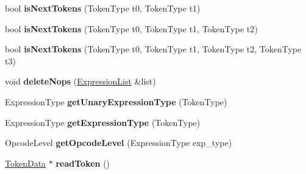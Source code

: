 \begin{DoxyCompactItemize}
\item 
bool {\bfseries is\+Next\+Tokens} (Token\+Type t0, Token\+Type t1)\hypertarget{class_object_script_1_1_o_s_1_1_core_1_1_compiler_a6330a2c5da53bb10a692d3b390b13b20}{}\label{class_object_script_1_1_o_s_1_1_core_1_1_compiler_a6330a2c5da53bb10a692d3b390b13b20}

\item 
bool {\bfseries is\+Next\+Tokens} (Token\+Type t0, Token\+Type t1, Token\+Type t2)\hypertarget{class_object_script_1_1_o_s_1_1_core_1_1_compiler_adafed82bae5313c8b7965a3db9e4e2ef}{}\label{class_object_script_1_1_o_s_1_1_core_1_1_compiler_adafed82bae5313c8b7965a3db9e4e2ef}

\item 
bool {\bfseries is\+Next\+Tokens} (Token\+Type t0, Token\+Type t1, Token\+Type t2, Token\+Type t3)\hypertarget{class_object_script_1_1_o_s_1_1_core_1_1_compiler_a9a2380d2370b1dfd2627f7a5cec78ec1}{}\label{class_object_script_1_1_o_s_1_1_core_1_1_compiler_a9a2380d2370b1dfd2627f7a5cec78ec1}

\item 
void {\bfseries delete\+Nops} (\hyperlink{struct_object_script_1_1_o_s_1_1_core_1_1_compiler_1_1_expression_list}{Expression\+List} \&list)\hypertarget{class_object_script_1_1_o_s_1_1_core_1_1_compiler_ad318617fef184ea91c1d6c526dbc9d29}{}\label{class_object_script_1_1_o_s_1_1_core_1_1_compiler_ad318617fef184ea91c1d6c526dbc9d29}

\item 
Expression\+Type {\bfseries get\+Unary\+Expression\+Type} (Token\+Type)\hypertarget{class_object_script_1_1_o_s_1_1_core_1_1_compiler_a2e6e537dce170b4e7a289423f43798f1}{}\label{class_object_script_1_1_o_s_1_1_core_1_1_compiler_a2e6e537dce170b4e7a289423f43798f1}

\item 
Expression\+Type {\bfseries get\+Expression\+Type} (Token\+Type)\hypertarget{class_object_script_1_1_o_s_1_1_core_1_1_compiler_a0f6bf8aeacf3769ac3804ab33aa73d17}{}\label{class_object_script_1_1_o_s_1_1_core_1_1_compiler_a0f6bf8aeacf3769ac3804ab33aa73d17}

\item 
Opcode\+Level {\bfseries get\+Opcode\+Level} (Expression\+Type exp\+\_\+type)\hypertarget{class_object_script_1_1_o_s_1_1_core_1_1_compiler_ab44067cde4221dbf1edce28a9cd4b687}{}\label{class_object_script_1_1_o_s_1_1_core_1_1_compiler_ab44067cde4221dbf1edce28a9cd4b687}

\item 
\hyperlink{class_object_script_1_1_o_s_1_1_core_1_1_tokenizer_1_1_token_data}{Token\+Data} $\ast$ {\bfseries read\+Token} ()\hypertarget{class_object_script_1_1_o_s_1_1_core_1_1_compiler_a0c54b6a11f4e66a68ab4c874a30256f5}{}\label{class_object_script_1_1_o_s_1_1_core_1_1_compiler_a0c54b6a11f4e66a68ab4c874a30256f5}


\end{DoxyCompactItemize}
